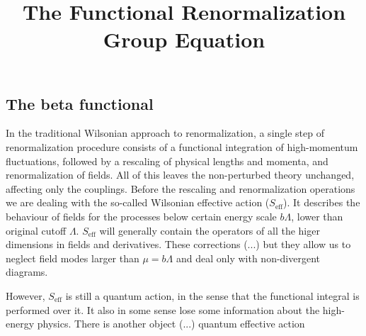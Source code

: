 \documentclass[11pt, a4paper]{article}
\title{\vspace{-2cm}The Functional Renormalization Group Equation}
\date{}
\begin{document}
\maketitle


\begin{center}
    \subsection*{The beta functional}
\end{center}

In the traditional Wilsonian approach to renormalization, a single step of renormalization procedure consists of
a functional integration of high-momentum fluctuations, followed by a rescaling of physical lengths and momenta, and
renormalization of fields. All of this leaves the non-perturbed theory unchanged, affecting only the couplings.
Before the rescaling and renormalization operations we are dealing with the so-called Wilsonian effective action ($S_{\text{eff}}$).
It describes the behaviour of fields for the processes below certain energy scale $b\Lambda$, lower than original cutoff $\Lambda$.
$S_{\text{eff}}$ will generally contain the operators of all the higer dimensions in fields and derivatives.
These corrections (...) but they allow us to neglect field modes larger than $\mu = b\Lambda$ and deal only with non-divergent diagrams.

However, $S_{\text{eff}}$ is still a quantum action, in the sense that the functional integral is performed over it. It also
in some sense lose some information about the high-energy physics.
There is another object (...) quantum effective action


\end{document}
